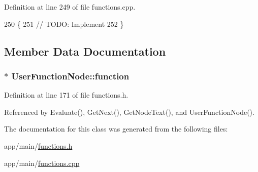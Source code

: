 Definition at line 249 of file functions.\+cpp.


\begin{DoxyCode}
250 \{
251     \textcolor{comment}{// TODO: Implement}
252 \}
\end{DoxyCode}


\subsection{Member Data Documentation}
\subsubsection[{\texorpdfstring{function}{function}}]{$\ast$ User\+Function\+Node\+::function\hspace{0.3cm}{\ttfamily [private]}}\hypertarget{classUserFunctionNode_aea2ba2bacd83f3cceb891b0b3e45580c}{}\label{classUserFunctionNode_aea2ba2bacd83f3cceb891b0b3e45580c}


Definition at line 171 of file functions.\+h.



Referenced by Evaluate(), Get\+Next(), Get\+Node\+Text(), and User\+Function\+Node().



The documentation for this class was generated from the following files\+:\begin{DoxyCompactItemize}
\item 
app/main/\hyperlink{functions_8h}{functions.\+h}\item 
app/main/\hyperlink{functions_8cpp}{functions.\+cpp}\end{DoxyCompactItemize}
